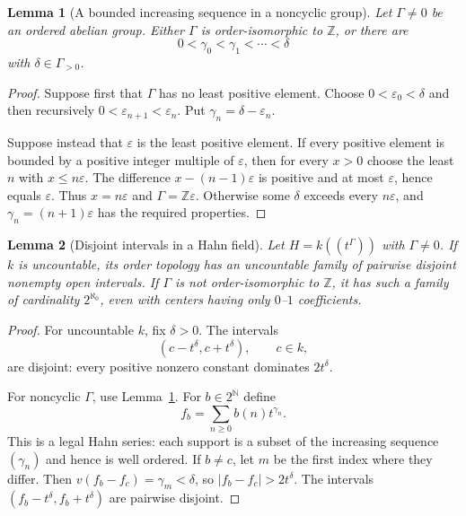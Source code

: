 \documentclass[11pt]{article}
\numberwithin{equation}{section}
\newtheorem{lemma}[lemma]{Lemma}
\theoremstyle{definition}
\theoremstyle{remark}
\newcommand{\N}{\mathbb N}
\newcommand{\Z}{\mathbb Z}
\begin{document}
\begin{lemma}[A bounded increasing sequence in a noncyclic group]
\label{pma:ser:lem:gamma}
Let $\Gamma\ne0$ be an ordered abelian group. Either $\Gamma$ is
order-isomorphic to $\Z$, or there are
\[
 0<\gamma_0<\gamma_1<\cdots<\delta
\]
with $\delta\in\Gamma_{>0}$.
\end{lemma}
\begin{proof}
Suppose first that $\Gamma$ has no least positive element. Choose
$0<\varepsilon_0<\delta$ and then recursively
$0<\varepsilon_{n+1}<\varepsilon_n$. Put
$\gamma_n=\delta-\varepsilon_n$.

Suppose instead that $\varepsilon$ is the least positive element.
If every positive element is bounded by a positive integer multiple of
$\varepsilon$, then for every $x>0$ choose the least $n$ with
$x\leq n\varepsilon$. The difference
$x-(n-1)\varepsilon$ is positive and at most $\varepsilon$, hence equals
$\varepsilon$. Thus $x=n\varepsilon$ and $\Gamma=\Z\varepsilon$.
Otherwise some $\delta$ exceeds every $n\varepsilon$, and
$\gamma_n=(n+1)\varepsilon$ has the required properties.
\end{proof}

\begin{lemma}[Disjoint intervals in a Hahn field]\label{pma:ser:lem:separated}
Let $H=k((t^\Gamma))$ with $\Gamma\ne0$.
If $k$ is uncountable, its order topology has an uncountable family of
pairwise disjoint nonempty open intervals.
If $\Gamma$ is not order-isomorphic to $\Z$, it has such a family of
cardinality $2^{\aleph_0}$, even with centers having only $0$--$1$ coefficients.
\end{lemma}
\begin{proof}
For uncountable $k$, fix $\delta>0$. The intervals
\[
 (c-t^\delta,c+t^\delta),\qquad c\in k,
\]
are disjoint: every positive nonzero constant dominates $2t^\delta$.

For noncyclic $\Gamma$, use Lemma~\ref{pma:ser:lem:gamma}. For
$b\in2^{\N}$ define
\[
 f_b=\sum_{n\geq0} b(n)t^{\gamma_n}.
\]
This is a legal Hahn series: each support is a subset of the increasing
sequence $(\gamma_n)$ and hence is well ordered. If $b\ne c$, let $m$ be
the first index where they differ. Then
$v(f_b-f_c)=\gamma_m<\delta$, so
$|f_b-f_c|>2t^\delta$. The intervals
$(f_b-t^\delta,f_b+t^\delta)$ are pairwise disjoint.
\end{proof}
\end{document}
